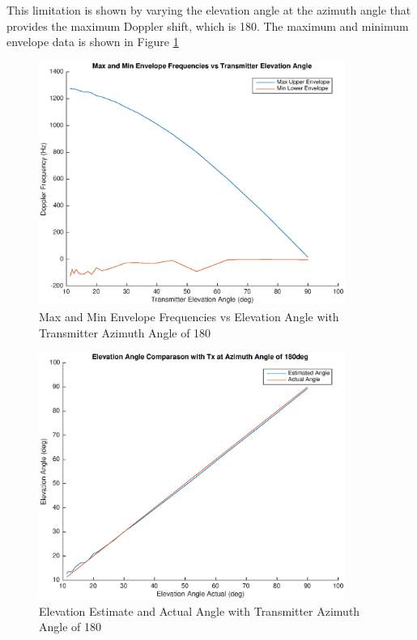 This limitation is shown by varying the elevation angle at the azimuth angle that provides the maximum Doppler shift, which is 180\textdegree. The maximum and minimum envelope data is shown in Figure \ref{fig:envelope_180deg}

\begin{figure}
	\begin{center}
		\includegraphics[width=10cm]{images/results/Elevation_angle_envelopes_180deg_Azimuth.eps}
		\caption{Max and Min Envelope Frequencies vs Elevation Angle with Transmitter Azimuth Angle of 180\textdegree}
		\label{fig:envelope_180deg}
	\end{center}
\end{figure}

\begin{figure}
	\begin{center}
		\includegraphics[width=10cm]{images/results/Elevation_angle_comparason_180deg_Azimuth.eps}
		\caption{Elevation Estimate and Actual Angle with Transmitter Azimuth Angle of 180\textdegree}
		\label{fig:angle_comparason_180deg}
	\end{center}
\end{figure}

